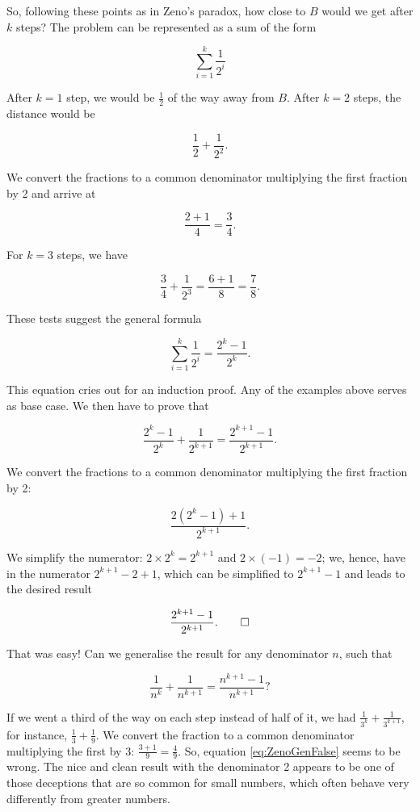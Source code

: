 \documentclass[tikz]{scrreprt}
\begin{document}
So, following these points as in Zeno's paradox,
how close to $B$ would we get after $k$ steps?
The problem can be represented as a sum of the form

\[
\sum_{i=1}^k{\frac{1}{2^i}}
\]

After $k=1$ step, we would be $\frac{1}{2}$ of the way
away from $B$. After $k=2$ steps, the distance would be

\[
\frac{1}{2} + \frac{1}{2^2}.
\]

We convert the fractions to a common denominator
multiplying the first fraction by 2 and arrive at

\[
\frac{2+1}{4} = \frac{3}{4}. 
\]

For $k=3$ steps, we have

\[
\frac{3}{4} + \frac{1}{2^3} =
\frac{6+1}{8} = \frac{7}{8}.
\]

These tests suggest the general formula

\begin{equation}\label{eq:Zeno2}
\sum_{i=1}^k{\frac{1}{2^i}} =
\frac{2^k - 1}{2^k}.
\end{equation}

This equation cries out for an induction proof.
Any of the examples above serves as base case.
We then have to prove that

\begin{equation}
\frac{2^k - 1}{2^k} + \frac{1}{2^{k+1}} = 
\frac{2^{k+1}-1}{2^{k+1}}.
\end{equation}

We convert the fractions to a common denominator
multiplying the first fraction by 2:

\[
\frac{2(2^k - 1) + 1}{2^{k+1}}.
\]

We simplify the numerator: 
$2 \times 2^k = 2^{k+1}$ and
$2 \times (-1) = -2$; we, hence, have in the numerator
$2^{k+1} - 2 + 1$, which can be simplified to
$2^{k+1} - 1$ and leads to the desired result

\[
\frac{2^{k+1} - 1}{2^{k+1}}.\qed
\]

That was easy!
Can we generalise the result for any denominator $n$,
such that

\begin{equation}\label{eq:ZenoGenFalse}
\frac{1}{n^k} + \frac{1}{n^{k+1}} = 
\frac{n^{k+1} - 1}{n^{k+1}}?
\end{equation}

If we went a third of the way on each step
instead of half of it, we had
$\frac{1}{3^k} + \frac{1}{3^{k+1}}$, for instance,
$\frac{1}{3} + \frac{1}{9}$.
We convert the fraction to a common 
denominator multiplying the first by 3:
$\frac{3+1}{9} = \frac{4}{9}$.
So, equation \ref{eq:ZenoGenFalse} seems to be wrong.
The nice and clean result with the denominator 2
appears to be one of those deceptions that are so common
for small numbers, which often behave very differently
from greater numbers.
\end{document}
